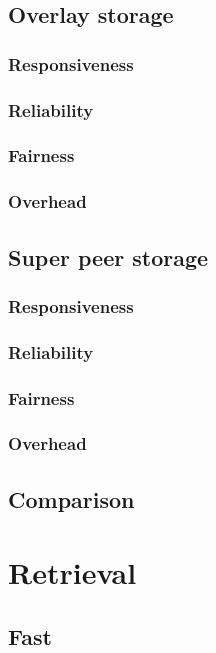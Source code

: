             \subsection{Overlay storage}
                \subsubsection{Responsiveness}
                \subsubsection{Reliability}
                \subsubsection{Fairness}
                \subsubsection{Overhead}
            \subsection{Super peer storage}
                \subsubsection{Responsiveness}
                \subsubsection{Reliability}
                \subsubsection{Fairness}
                \subsubsection{Overhead}
            \subsection{Comparison}
            
    \section{Retrieval}
    \label{reliability_compare_retrieval}
            \subsection{Fast}
